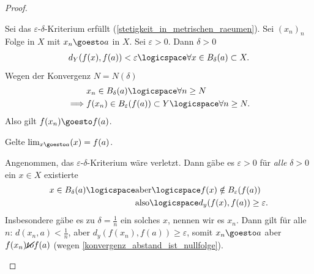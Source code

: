 \begin{proof}
    \begin{proofdescription}
        
        \item[\hin] Sei das \( \varepsilon \)-\( \delta \)-Kriterium erfüllt (\ref{stetigkeit_in_metrischen_raeumen}).
        Sei \( (x_n)_n \) Folge in \( X \) mit \( x_n\goesto a \) in \( X \). Sei \( \varepsilon>0 \). Dann \texists \( \delta>0 \) \sd
        \begin{align*}
            d_Y(f(x),f(a))<\varepsilon\logicspace\forall x\in B_\delta(a)\subset X.
        \end{align*} 
        Wegen der Konvergenz \texists \( N=N(\delta) \) \sd
        \begin{align*}
            &x_n\in B_\delta(a) \logicspace\forall n\geq N\\
            \implies &f(x_n)\in B_\varepsilon(f(a))\subset Y \logicspace \forall n\geq N.
        \end{align*}
        Also gilt \( f(x_n)\goesto f(a) \).
        \item[\rueck] Gelte \( \lim_{x \goesto a} (x)=f(a) \).
        
        Angenommen, das \( \varepsilon \)-\( \delta \)-Kriterium wäre verletzt. Dann gäbe es \( \varepsilon>0 \) \sd für \emph{alle} \( \delta>0 \) ein \( x\in X \) existierte \sd
        \begin{align*}
            x\in B_\delta(a)\logicspace \begin{aligned}[t] 
                &\text{aber} \logicspace f(x)\notin B_\varepsilon(f(a))\\
                &\text{also} \logicspace d_y(f(x), f(a)) \geq \varepsilon.
            \end{aligned}
        \end{align*}
        Insbesondere gäbe es zu \( \delta=\frac{1}{n} \) ein solches \( x \), nennen wir es \( x_n \). Dann gilt für alle \( n \): \( d(x_n,a)<\frac{1}{n} \), aber \( d_y(f(x_n),f(a))\geq \varepsilon \), somit \( x_n\goesto a \) aber \( f(x_n)\cancel{to}f(a) \) (wegen \ref{konvergenz_abstand_ist_nullfolge}).
    \end{proofdescription}
    
    
\end{proof}
